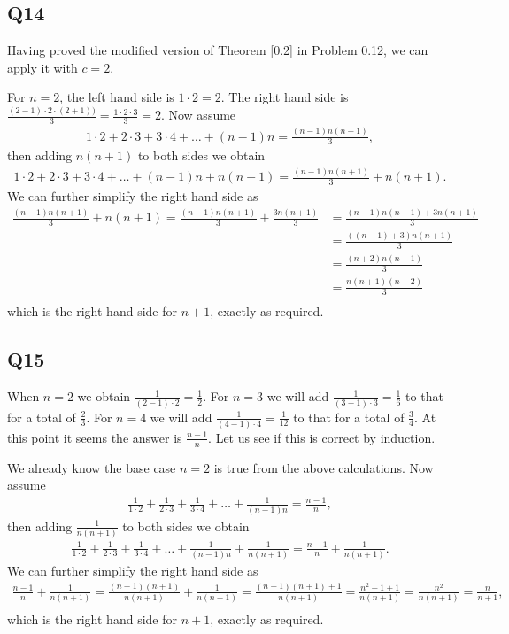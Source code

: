 \documentclass[12pt]{article}
\numberwithin{theorem}{section}
\numberwithin{equation}{section}
\numberwithin{remark}{section}
\numberwithin{definition}{section}
\numberwithin{theorem}{section}
\numberwithin{lemma}{section}
\numberwithin{example}{section}
\begin{document}
\subsection{Q14}

Having proved the modified version of Theorem [0.2] in Problem 0.12, we can apply it with $c=2$. 

For $n=2$, the left hand side is $1\cdot 2=2$. The right hand side is $\frac{(2-1)\cdot2\cdot(2+1))}{3}=\frac{1\cdot2\cdot3}{3}=2$. Now assume
\begin{align*}
	1 \cdot 2 + 2 \cdot 3 + 3 \cdot 4 + \ldots + (n-1)n = \frac{(n-1)n(n+1)}{3},
\end{align*}
then adding $n(n+1)$ to both sides we obtain 
\begin{align*}
	1 \cdot 2 + 2 \cdot 3 + 3 \cdot 4 + \ldots + (n-1)n + n(n+1) = \frac{(n-1)n(n+1)}{3} + n(n+1).
\end{align*}
We can further simplify the right hand side as 
\begin{align*}
	\frac{(n-1)n(n+1)}{3} + n(n+1) = \frac{(n-1)n(n+1)}{3} + \frac{3n(n+1)}{3} & = \frac{(n-1)n(n+1)+3n(n+1)}{3}\\
	& = \frac{((n-1)+3)n(n+1)}{3}\\
	& = \frac{(n+2)n(n+1)}{3}\\
	& = \frac{n(n+1)(n+2)}{3}\\
\end{align*}
which is the right hand side for $n+1$, exactly as required. 



\subsection{Q15}

When $n=2$ we obtain $\frac{1}{(2-1)\cdot2}=\frac{1}{2}$. For $n=3$ we will add $\frac{1}{(3-1)\cdot3}=\frac{1}{6}$ to that for a total of $\frac{2}{3}$. For $n=4$ we will add $\frac{1}{(4-1)\cdot4}=\frac{1}{12}$ to that for a total of $\frac{3}{4}$. At this point it seems the answer is $\frac{n-1}{n}$. Let us see if this is correct by induction. 

We already know the base case $n=2$ is true from the above calculations. Now assume
\begin{align*}
	\frac{1}{1\cdot 2} + \frac{1}{2\cdot 3} + \frac{1}{3\cdot 4} + \ldots + \frac{1}{(n-1) n} = \frac{n-1}{n},
\end{align*}
then adding $\frac{1}{n(n+1)}$ to both sides we obtain
\begin{align*}
	\frac{1}{1\cdot 2} + \frac{1}{2\cdot 3} + \frac{1}{3\cdot 4} + \ldots + \frac{1}{(n-1) n} + \frac{1}{n(n+1)} = \frac{n-1}{n} + \frac{1}{n(n+1)}.
\end{align*}
We can further simplify the right hand side as 
\begin{align*}
	\frac{n-1}{n} + \frac{1}{n(n+1)} = \frac{(n-1)(n+1)}{n(n+1)} + \frac{1}{n(n+1)} = \frac{(n-1)(n+1) + 1}{n(n+1)} = \frac{n^2-1+1}{n(n+1)} = \frac{n^2}{n(n+1)} = \frac{n}{n+1},\\
\end{align*}
which is the right hand side for $n+1$, exactly as required. 
\end{document}
